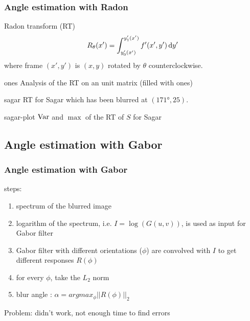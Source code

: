 \begin{frame}[allowframebreaks]
  \frametitle{Angle estimation with Radon}
  \begin{block}{Radon transform (RT)}
    \[ R_\theta(x') = \int_{y_0'(x')}^{y_1'(x')} f'(x',y') \operatorname{d}\! y' \]
    where frame $(x',y')$ is $(x,y)$ rotated by $\theta$ counterclockwise.
  \end{block}

  \begin{myfig}{ones}
    {Analysis of the RT on an unit matrix (filled with ones)}
  \end{myfig}

  \begin{myfig}{sagar}
    {RT for Sagar which has been blurred at $(\ang{171}, 25)$.}
  \end{myfig}

  \begin{myfig}{sagar-plot}
    {$\operatorname{Var}$ and $\max$ of the RT of $S$ for Sagar}
  \end{myfig}
\end{frame}

\subsection{Angle estimation with Gabor}
\begin{frame}
	\frametitle{Angle estimation with Gabor}
	steps:
	\begin{enumerate}
	\item spectrum of the blurred image
	\item logarithm of the spectrum, i.e. $I=\log(G(u,v))$, is used as input for Gabor filter
	\item Gabor filter with different orientations ($\phi$) are convolved with $I$ to get different responses $R(\phi)$
	\item for every $\phi$, take the $L_2$ norm
	\item blur angle : $\alpha = arg{max_{\phi}||R(\phi)||_2}$
	\end{enumerate}
	
	Problem: didn't work, not enough time to find errors
\end{frame}


